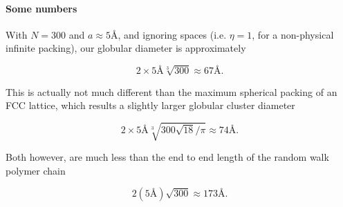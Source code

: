 {\paragraph{Some numbers}

With $N = 300$ and $a \approx 5 \text{\AA}$, and ignoring spaces (i.e. $\eta = 1$, for a non-physical infinite packing), our globular diameter is approximately

\begin{equation}\label{eqn:basicStatMechProblemSet3Problem2:240}
2 \times 5 \text{\AA} \sqrt[3]{300} \approx 67 \text{\AA}.
\end{equation}

This is actually not much different than the maximum spherical packing of an FCC lattice, which results a slightly larger globular cluster diameter

\begin{equation}\label{eqn:basicStatMechProblemSet3Problem2:260}
2 \times 5 \text{\AA} \sqrt[3]{300 \sqrt{18}/\pi} \approx 74 \text{\AA}.
\end{equation}

Both however, are much less than the end to end length of the random walk polymer chain

\begin{equation}\label{eqn:basicStatMechProblemSet3Problem2:220}
2 (5 \text{\AA}) \sqrt{300} \approx 173 \text{\AA}.
\end{equation}
}
